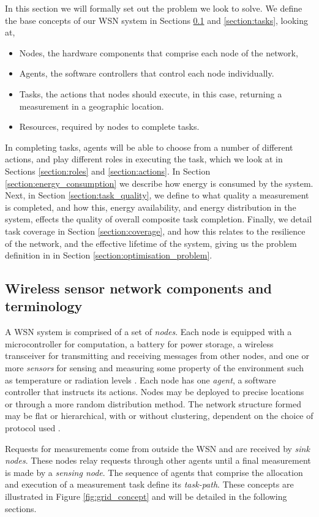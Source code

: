 
In this section we will formally set out the problem we look to solve. We define the base concepts of our WSN system in Sections \ref{section:terminology} and \ref{section:tasks}, looking at,
\begin{itemize}
	\item Nodes, the hardware components that comprise each node of the network,
	\item Agents, the software controllers that control each node individually.
	\item Tasks, the actions that nodes should execute, in this case, returning a measurement in a geographic location.
	\item Resources, required by nodes to complete tasks. 
\end{itemize}
In completing tasks, agents will be able to choose from a number of different actions, and play different roles in executing the task, which we look at in Sections \ref{section:roles} and \ref{section:actions}. In Section \ref{section:energy_consumption} we describe how energy is consumed by the system. Next, in Section \ref{section:task_quality}, we define to what quality a measurement is completed, and how this, energy availability, and energy distribution in the system, effects the quality of overall composite task completion. Finally, we detail task coverage in Section \ref{section:coverage}, and how this relates to the resilience of the network, and the effective lifetime of the system, giving us the problem definition in in Section \ref{section:optimisation_problem}.

\subsection{Wireless sensor network components and terminology}
\label{section:terminology}

A WSN system is comprised of a set of \textit{nodes}. Each node is equipped with a microcontroller for computation, a battery for power storage, a wireless transceiver for  transmitting and receiving messages from other nodes, and one or more \textit{sensors} for sensing and measuring some property of the environment such as temperature or radiation levels \citep{muhammad_r_ahmed_2012_1072589}. Each node has one \textit{agent}, a software controller that instructs its actions. Nodes may be deployed to precise locations or through a more random distribution method. The network structure formed may be flat or hierarchical, with or without clustering, dependent on the choice of protocol used \citep{Carlos-Mancilla2016b}. 

Requests for measurements come from outside the WSN and are received by \textit{sink nodes}. These nodes relay requests through other agents until a final measurement is made by a \textit{sensing node}. The sequence of agents that comprise the allocation and execution of a measurement task define its \textit{task-path}. These concepts are illustrated in Figure \ref{fig:grid_concept} and will be detailed in the following sections.